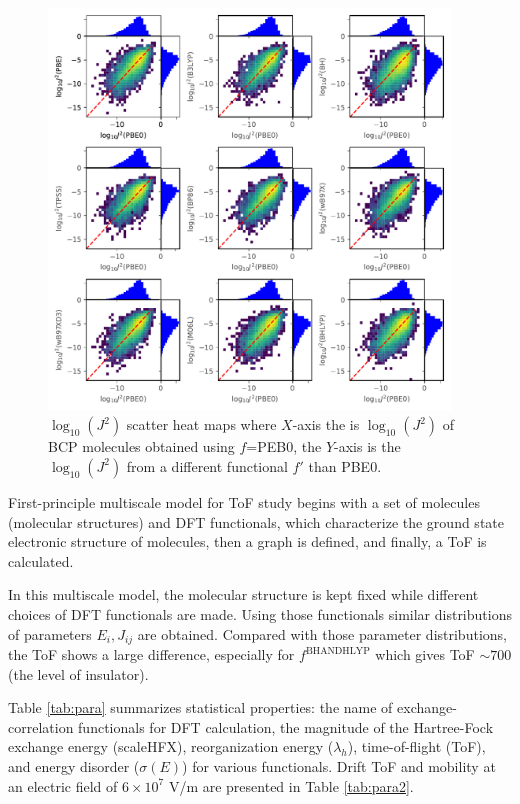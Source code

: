 \documentclass[letterpaper,12pt]{article}
\begin{document}
\begin{figure}
    \centering
    \includegraphics[width=0.95\textwidth]{figs/scatterJ_all.pdf}
    \caption{$\log_{10}(J^2)$ scatter heat maps where $X$-axis the is $\log_{10}(J^2)$ of BCP molecules obtained using $f$=PEB0, the $Y$-axis is the $\log_{10}(J^2)$ from a different functional $f'$ than PBE0.}
    \label{fig:scatterJ}
\end{figure}

First-principle multiscale model for ToF study begins with a set of molecules (molecular structures) and DFT functionals, which characterize the ground state electronic structure of molecules, then a graph is defined, and finally, a ToF is calculated. 

In this multiscale model, the molecular structure is kept fixed while different choices of DFT functionals are made. Using those functionals similar distributions of parameters $E_i,J_{ij}$ are obtained. 
Compared with those parameter distributions, the ToF shows a large difference, especially for $f^\text{BHANDHLYP}$ which gives ToF $\sim 700$ (the level of insulator).

Table \ref{tab:para} summarizes statistical properties: the name of exchange-correlation functionals for DFT calculation, the magnitude of the Hartree-Fock exchange energy (scaleHFX), reorganization energy ($\lambda_h$), time-of-flight (ToF), and energy disorder ($\sigma(E)$) for various functionals. Drift ToF and mobility at an electric field of $6 \times 10^7$ V/m are presented in Table \ref{tab:para2}.
\end{document}
